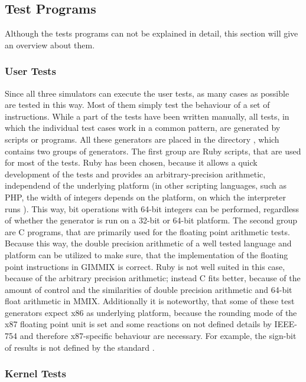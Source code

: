 \subsection{Test Programs}

Although the tests programs can not be explained in detail, this section will give an overview about them.

\subsubsection{User Tests}

Since all three simulators can execute the user tests, as many cases as possible are tested in this way. Most of them simply test the behaviour of a set of instructions. While a part of the tests have been written manually, all tests, in which the individual test cases work in a common pattern, are generated by scripts or programs. All these generators are placed in the directory , which contains two groups of generators. The first group are \gls{Ruby} scripts, that are used for most of the tests. \gls{Ruby} has been chosen, because it allows a quick development of the tests and provides an arbitrary-precision arithmetic, independend of the underlying platform (in other scripting languages, such as \gls{PHP}, the width of integers depends on the platform, on which the interpreter runs \citep{php-intwidth}). This way, \eg bit operations with 64-bit integers can be performed, regardless of whether the generator is run on a 32-bit or 64-bit platform. The second group are C programs, that are primarily used for the floating point arithmetic tests. Because this way, the double precision arithmetic of a well tested language and platform can be utilized to make sure, that the implementation of the floating point instructions in GIMMIX is correct. \gls{Ruby} is not well suited in this case, because of the arbitrary precision arithmetic; instead C fits better, because of the amount of control and the similarities of double precision arithmetic and 64-bit float arithmetic in MMIX. Additionally it is noteworthy, that some of these test generators expect x86 as underlying platform, because the rounding mode of the x87 floating point unit is set and some reactions on not defined details by IEEE-754 and therefore x87-specific behaviour are necessary. For example, the sign-bit of \NaN results is not defined by the standard \citep[pg. 17]{ieee754}.

\subsubsection{Kernel Tests}

